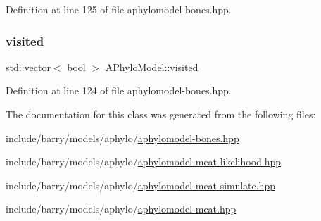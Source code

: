 Definition at line 125 of file aphylomodel-\/bones.\+hpp.

\mbox{\label{class_a_phylo_model_ac98b6767ff0c32b30caf23dbf6810578}} 
\subsubsection{\texorpdfstring{visited}{visited}}
{\footnotesize\ttfamily std\+::vector$<$ bool $>$ A\+Phylo\+Model\+::visited}



Definition at line 124 of file aphylomodel-\/bones.\+hpp.



The documentation for this class was generated from the following files\+:\begin{DoxyCompactItemize}
\item 
include/barry/models/aphylo/\hyperlink{aphylomodel-bones_8hpp}{aphylomodel-\/bones.\+hpp}\item 
include/barry/models/aphylo/\hyperlink{aphylomodel-meat-likelihood_8hpp}{aphylomodel-\/meat-\/likelihood.\+hpp}\item 
include/barry/models/aphylo/\hyperlink{aphylomodel-meat-simulate_8hpp}{aphylomodel-\/meat-\/simulate.\+hpp}\item 
include/barry/models/aphylo/\hyperlink{aphylomodel-meat_8hpp}{aphylomodel-\/meat.\+hpp}\end{DoxyCompactItemize}
